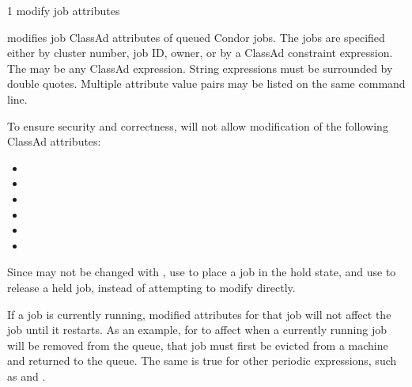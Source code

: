 \begin{ManPage}{\label{man-condor-qedit}}{1}
{modify job attributes}
\Synopsis {}
\ToolDebugOption
{}
\Arg{\Dots}


\Description

 modifies job ClassAd attributes of queued Condor jobs.
The jobs are specified either by cluster number, job ID,
owner, or by a ClassAd constraint expression.
The  may be any ClassAd expression.
String expressions must be surrounded by double quotes.
Multiple attribute value pairs may be listed on the same
command line.

To ensure security and correctness,
 will not allow modification of the following
ClassAd attributes:
\begin{itemize}
\item {}
\item {}
\item {}
\item {}
\item {}
\item {}
\end{itemize}

Since  may not be changed with ,
use  to place a job in the hold state,
and use  to release a held job,
instead of attempting to modify  directly.

If a job is currently running, modified attributes for that job will not 
affect the job until it restarts.
As an example, for
 to affect when a currently running job will be
removed from the queue, 
that job must first be evicted from a machine and returned to the queue.
The same is true for other periodic expressions, 
such as  and .

\begin{Options}
    \ToolDebugDesc
\end{Options}


\end{ManPage}
